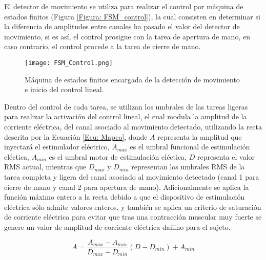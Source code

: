 El detector de movimiento se utiliza para realizar el control por máquina de estados finitos (Figura \ref{Figura: FSM_control}), la cual consisten en determinar si la diferencia de amplitudes entre canales ha pasado el valor del detector de movimiento, si es así, el control prosigue con la tarea de apertura de mano, en caso contrario, el control procede a la tarea de cierre de mano.

\begin{figure}[htbp]
	\centering
	\texttt{[image: FSM\_Control.png]}
	\caption{Máquina de estados finitos encargada de la detección de movimiento e inicio del control lineal.}
	\label{Figura: FSM_Control}
\end{figure}

Dentro del control de cada tarea, se utilizan los umbrales de las tareas ligeras para realizar la activación del control lineal, el cual modula la amplitud de la corriente eléctrica, del canal asociado al movimiento detectado, utilizando la recta descrita por la Ecuación \ref{Ecu: Mapeo}, donde $A$ representa la amplitud que inyectará el estimulador eléctrico, $A_{max}$ es el umbral funcional de estimulación eléctica, $A_{min}$ es el umbral motor de estimulación eléctica, $D$ representa el valor RMS actual, mientras que $D_{max}$ y $D_{min}$ representan los umbrales RMS de la tarea completa y ligera del canal asociado al movimiento detectado (canal 1 para cierre de mano y canal 2 para apertura de mano). Adicionalmente se aplica la función máximo entero a la recta debido a que el dispositivo de estimulación eléctrica sólo admite valores enteros, y también se aplica un criterio de saturación de corriente eléctrica para evitar que tras una contracción muscular muy fuerte se genere un valor de amplitud de corriente eléctrica dañino para el sujeto.

\begin{equation}
	A = \frac{A_{max} - A_{min}}{D_{max} - D_{min}}(D - D_{min}) + A_{min}
	\label{Ecu: Mapeo}
\end{equation}

